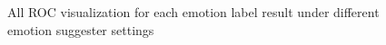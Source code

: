 \documentclass{article} %
\begin{document}
\begin{figure}[h]
    \caption{All ROC visualization for each emotion label result under different emotion suggester settings}
\end{figure}
\end{document}
